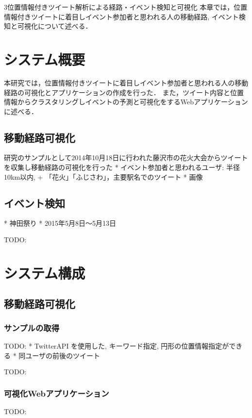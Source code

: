 \chapterhead
{3}{位置情報付きツイート解析による経路・イベント検知と可視化}
{本章では，位置情報付きツイートに着目しイベント参加者と思われる人の移動経路, イベント検知と可視化について述べる．}


\section{システム概要}
本研究では，位置情報付きツイートに着目しイベント参加者と思われる人の移動経路の可視化とアプリケーションの作成を行った．
また，ツイート内容と位置情報からクラスタリングしイベントの予測と可視化をするWebアプリケーションに述べる．

\subsection{移動経路可視化}
 研究のサンプルとして2014年10月18日に行われた藤沢市の花火大会からツイートを収集し移動経路の可視化を行った
* イベント参加者と思われるユーザ: 半径10km以内, + 「花火」「ふじさわ」，主要駅名でのツイート
* 画像

\subsection{イベント検知}
* 神田祭り
* 2015年5月8日〜5月13日

TODO:

\newpage

\section{システム構成}
\subsection{移動経路可視化}
\subsubsection{サンプルの取得}
TODO:
* TwitterAPI を使用した, キーワード指定, 円形の位置情報指定ができる
* 同ユーザの前後のツイート

TODO:

\subsubsection{可視化Webアプリケーション}
TODO:

